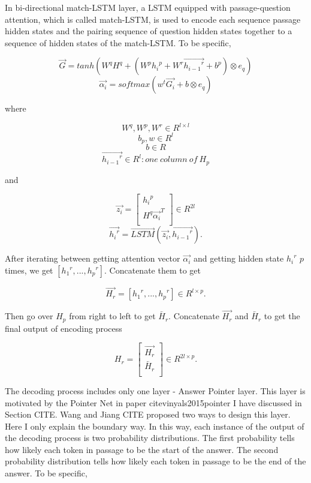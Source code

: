 \documentclass[modernstyle,12pt]{sjsuthesis}
\theoremstyle{definition}
\begin{document}
In bi-directional match-LSTM layer, a LSTM equipped with passage-question attention, which is called match-LSTM, is used to encode each sequence passage hidden states and the pairing sequence of question hidden states together to a sequence of hidden states of the match-LSTM. To be specific,

$$\overrightarrow{G} = tanh(W^qH^q + (W^p{h_i}^p + W^r\overrightarrow{{h_{i-1}}^r} + b^p) \otimes e_q)$$
$$\overrightarrow{\alpha _i} = softmax(w^t\overrightarrow{G_i} + b \otimes e_q)$$


where

$$W^q, W^p, W^r\in R^{l \times l} $$
$$b_p, w\in R^{l}  $$
$$b \in R $$
$$\overrightarrow{{h_{i-1}}^r}\in R^{l}: one\ column\ of\ H_p  $$

and

\[ \overrightarrow{z_i} =
\begin{bmatrix}
{h_i}^p \\
H^q\overrightarrow{ {\alpha _i}}^T \\
\end{bmatrix}
\in R^{2l}
\]
$$\overrightarrow{{h_i}^r} = \overrightarrow{LSTM}(\overrightarrow{z_i}, \overrightarrow{{h_{i-1}}^r}).$$

After iterating between getting attention vector $\overrightarrow{\alpha _i}$ and getting hidden state ${{h_{i}}^r}$ $p$ times, we get $[{{h_{1}}^r}, ..., {{h_{p}}^r}]$. Concatenate them to get

$$\overrightarrow{H_r} = [{{h_{1}}^r}, ..., {{h_{p}}^r}] \in R^{l \times p}.$$

Then go over $H_p$ from right to left to get $\overleftarrow{H_r}$. Concatenate $\overrightarrow{H_r}$ and $\overleftarrow{H_r}$ to get the final output of encoding process

\[ H_r =
\begin{bmatrix}
\overrightarrow{H_r} \\
\overleftarrow{H_r} \\
\end{bmatrix}
\in R^{2l \times p}.
\]

The decoding process includes only one layer - Answer Pointer layer. This layer is motivated by the Pointer Net in paper citevinyals2015pointer I have discussed in Section CITE. Wang and Jiang CITE proposed two ways to design this layer. Here I only explain the boundary way. In this way, each instance of the output of the decoding process is two probability distributions. The first probability tells how likely each token in passage to be the start of the answer. The second probability distribution tells how likely each token in passage to be the end of the answer. To be specific,
\end{document}
